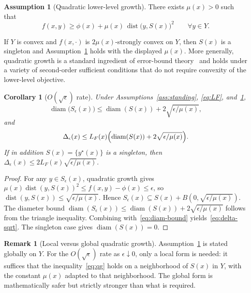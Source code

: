 \documentclass[11pt]{article}
\newtheorem{corollary}[theorem]{Corollary}
\theoremstyle{definition}
\newtheorem{assumption}[theorem]{Assumption}
\newtheorem{remark}[theorem]{Remark}
\newcommand{\eps}{\epsilon}
\DeclareMathOperator{\dist}{dist}
\DeclareMathOperator{\diam}{diam}
\begin{document}
\begin{assumption}[Quadratic lower-level growth]\label{ass:qg}
There exists $\mu(x)>0$ such that
\begin{equation}\label{eq:qg}
  f(x,y)\ge \phi(x)+\mu(x)\,\dist\bigl(y,S(x)\bigr)^2
  \qquad \forall y\in Y.
\end{equation}
\end{assumption}

If $Y$ is convex and $f(x,\cdot)$ is $2\mu(x)$-strongly convex
on $Y$, then $S(x)$ is a singleton and Assumption~\ref{ass:qg}
holds with the displayed $\mu(x)$. More generally, quadratic
growth is a standard ingredient of error-bound
theory~\cite{fabian2010error,drusvyatskiy2018error,luo1994extension}
and holds under a variety of second-order sufficient conditions
that do not require convexity of the lower-level objective.

\begin{corollary}[$O(\sqrt\eps)$ rate]\label{cor:sqrt-rate}
Under Assumptions~\ref{ass:standing}, \eqref{eq:LF},
and~\ref{ass:qg},
\begin{equation}\label{eq:diam-sqrt}
  \diam\bigl(S_\eps(x)\bigr)\le \diam(S(x))+2\sqrt{\eps/\mu(x)},
\end{equation}
and
\begin{equation}\label{eq:delta-sqrt}
  \Delta_\eps(x)\le L_F(x)\Bigl(\diam(S(x))+2\sqrt{\eps/\mu(x)}\Bigr).
\end{equation}
If in addition $S(x)=\{y^\star(x)\}$ is a singleton, then
$\Delta_\eps(x)\le 2L_F(x)\sqrt{\eps/\mu(x)}$.
\end{corollary}

\begin{proof}
For any $y\in S_\eps(x)$, quadratic growth
gives $\mu(x)\dist(y,S(x))^2\le f(x,y)-\phi(x)\le\eps$, so
$\dist(y,S(x))\le\sqrt{\eps/\mu(x)}$. Hence
$S_\eps(x)\subseteq S(x)+B(0,\sqrt{\eps/\mu(x)})$. The diameter
bound $\diam(S_\eps(x))\le\diam(S(x))+2\sqrt{\eps/\mu(x)}$ follows
from the triangle inequality. Combining
with~\eqref{eq:diam-bound} yields~\eqref{eq:delta-sqrt}. The
singleton case gives $\diam(S(x))=0$.
\end{proof}

\begin{remark}[Local versus global quadratic growth]\label{rem:qg-local}
Assumption~\ref{ass:qg} is stated globally on $Y$. For the
$O(\sqrt\eps)$ rate as $\eps\downarrow 0$, only a local form is
needed: it suffices that the inequality~\eqref{eq:qg} holds on a
neighborhood of $S(x)$ in $Y$, with the constant $\mu(x)$ adapted
to that neighborhood. The global form is mathematically safer but
strictly stronger than what is required.
\end{remark}
\end{document}
